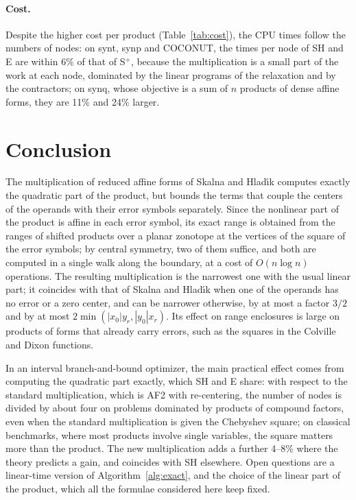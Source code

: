 \documentclass[11pt]{article}
\theoremstyle{definition}
\begin{document}
\paragraph{Cost.} Despite the higher cost per product (Table~\ref{tab:cost}), the CPU times follow the numbers of nodes: on synt, synp and COCONUT, the times per node of SH and E are within 6\% of that of S$^+$, because the multiplication is a small part of the work at each node, dominated by the linear programs of the relaxation and by the contractors; on synq, whose objective is a sum of $n$ products of dense affine forms, they are 11\% and 24\% larger.


\section{Conclusion}

The multiplication of reduced affine forms of Skalna and Hlad\'{\i}k computes exactly the quadratic part of the product, but bounds the terms that couple the centers of the operands with their error symbols separately. Since the nonlinear part of the product is affine in each error symbol, its exact range is obtained from the ranges of shifted products over a planar zonotope at the vertices of the square of the error symbols; by central symmetry, two of them suffice, and both are computed in a single walk along the boundary, at a cost of $O(n\log n)$ operations. The resulting multiplication is the narrowest one with the usual linear part; it coincides with that of Skalna and Hlad\'{\i}k when one of the operands has no error or a zero center, and can be narrower otherwise, by at most a factor $3/2$ and by at most $2\min(|x_0|y_r,|y_0|x_r)$. Its effect on range enclosures is large on products of forms that already carry errors, such as the squares in the Colville and Dixon functions.

In an interval branch-and-bound optimizer, the main practical effect comes from computing the quadratic part exactly, which SH and E share: with respect to the standard multiplication, which is AF2 with re-centering, the number of nodes is divided by about four on problems dominated by products of compound factors, even when the standard multiplication is given the Chebyshev square; on classical benchmarks, where most products involve single variables, the square matters more than the product. The new multiplication adds a further 4--8\% where the theory predicts a gain, and coincides with SH elsewhere. Open questions are a linear-time version of Algorithm~\ref{alg:exact}, and the choice of the linear part of the product, which all the formulae considered here keep fixed.
\end{document}
